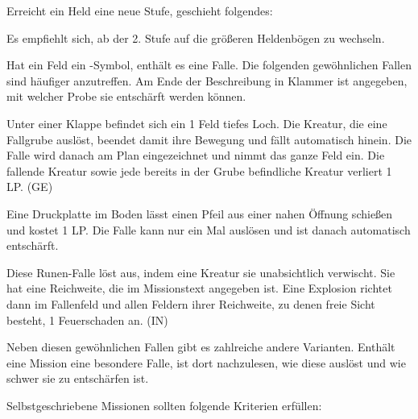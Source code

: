{		
			Erreicht ein Held eine neue Stufe, geschieht folgendes:


			\noindent
			Es empfiehlt sich, ab der 2. Stufe auf die größeren Heldenbögen zu wechseln.


		Hat ein Feld ein \trap-Symbol, enthält es eine Falle. Die folgenden gewöhnlichen Fallen sind häufiger anzutreffen. Am Ende der Beschreibung in Klammer ist angegeben, mit welcher Probe sie entschärft werden können.

		 Unter einer Klappe befindet sich ein 1 Feld tiefes Loch. Die Kreatur, die eine Fallgrube auslöst, beendet damit ihre Bewegung und fällt automatisch hinein. Die Falle wird danach am Plan eingezeichnet und nimmt das ganze Feld ein. Die fallende Kreatur sowie jede bereits in der Grube befindliche Kreatur verliert 1 LP. (GE)

		 Eine Druckplatte im Boden lässt einen Pfeil aus einer nahen Öffnung schießen und kostet 1 LP. Die Falle kann nur ein Mal auslösen und ist danach automatisch entschärft.

		 Diese Runen-Falle löst aus, indem eine Kreatur sie unabsichtlich verwischt. Sie hat eine Reichweite, die im Missionstext angegeben ist. Eine Explosion richtet dann im Fallenfeld und allen Feldern ihrer Reichweite, zu denen freie Sicht besteht, 1 Feuerschaden an. (IN)

		Neben diesen gewöhnlichen Fallen gibt es zahlreiche andere Varianten. Enthält eine Mission eine besondere Falle, ist dort nachzulesen, wie diese auslöst und wie schwer sie zu entschärfen ist.

		Selbstgeschriebene Missionen sollten folgende Kriterien erfüllen:

}
